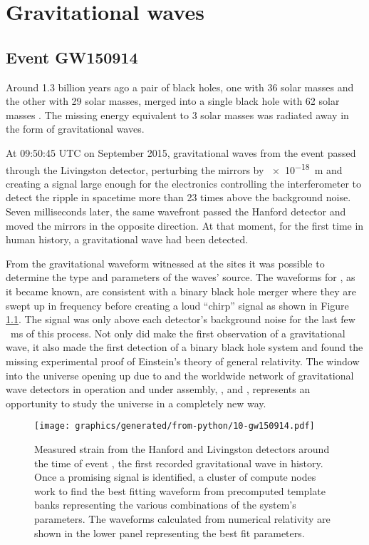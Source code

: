 \chapter{\label{c:gw-detection}Gravitational waves}

\section{Event GW150914}
Around \num{1.3} billion years ago a pair of black holes, one with \num{36} solar masses and the other with \num{29} solar masses, merged into a single black hole with \num{62} solar masses \cite{Abbott2016}. The missing energy equivalent to \num{3} solar masses was radiated away in the form of gravitational waves.

At 09:50:45 \gls{UTC} on  September 2015, gravitational waves from the event passed through the \LIGO{} Livingston detector, perturbing the mirrors by \SI{e-18}{\meter} and creating a signal large enough for the electronics controlling the interferometer to detect the ripple in spacetime more than \num{23} times above the background noise. Seven milliseconds later, the same wavefront passed the \LIGO{} Hanford detector and moved the mirrors in the opposite direction. At that moment, for the first time in human history, a gravitational wave had been detected.

From the gravitational waveform witnessed at the \LIGO{} sites it was possible to determine the type and parameters of the waves' source. The waveforms for \emph{\GWFIRSTEVENT{}}, as it became known, are consistent with a binary black hole merger where they are swept up in frequency before creating a loud ``chirp'' signal as shown in Figure\,\ref{fig:gw150914}. The signal was only above each detector's background noise for the last few \SI{}{\milli\second} of this process. Not only did \LIGO{} make the first observation of a gravitational wave, it also made the first detection of a binary black hole system and found the missing experimental proof of Einstein's theory of general relativity. The window into the universe opening up due to \LIGO{} and the worldwide network of gravitational wave detectors in operation and under assembly, \GEO{}, \VIRGO{} and \KAGRA{}, represents an opportunity to study the universe in a completely new way.

\begin{figure}
  \centering
  \texttt{[image: graphics/generated/from-python/10-gw150914.pdf]}
  \caption[Measured strain from the LIGO Hanford and Livingston detectors around the time of event \GWFIRSTEVENT{}]{\label{fig:gw150914}Measured strain from the \LIGO{} Hanford and Livingston detectors around the time of event \GWFIRSTEVENT{}, the first recorded gravitational wave in history. Once a promising signal is identified, a cluster of compute nodes work to find the best fitting waveform from precomputed template banks representing the various combinations of the system's parameters. The waveforms calculated from numerical relativity are shown in the lower panel representing the best fit parameters.}
\end{figure}

